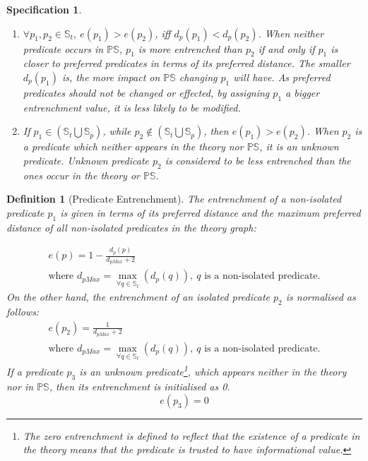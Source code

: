 \documentclass[11pt,letterpaper]{article}
\newtheorem{defn}{Definition}[section]
\newtheorem{spec}{Specification}
\newcommand{\ps}{\mathbb{PS}}
\begin{document}
\begin{spec}
\begin{enumerate}
\item $\forall p_{1},p_{2}  \in \mathbb{S}_{t},\ e(p_{1}) > e(p_{2})$, iff $d_{p}(p_{1}) < d_{p}(p_{2})$.\newline
\textnormal{When neither predicate occurs in $\ps$, $p_{1}$  is more entrenched than $p_{2}$  if and only if $p_{1}$ is closer to preferred predicates in terms of its preferred distance. The smaller $d_{p}(p_{1})$ is, the more impact on $\ps$ changing  $p_{1}$ will have. As preferred  predicates should not be changed or effected, by assigning $p_{1}$  a bigger entrenchment value, it is less likely to be modified. }
\item If $p_{1} \in (\mathbb{S}_{t} \bigcup \mathbb{S}_{p})$, while $p_{2} \not\in (\mathbb{S}_{t} \bigcup \mathbb{S}_{p})$, then $ e(p_{1}) > e(p_{2})$.\newline
\textnormal{When $p_{2}$ is a predicate which neither appears in the theory nor $\ps$, it is an \emph{unknown predicate}. Unknown predicate $p_{2}$ is considered to be less entrenched than the ones occur in the theory or $\ps$.}
\end{enumerate}
\end{spec}


\begin{defn}[Predicate Entrenchment]\label{def:predEn}
The entrenchment of a non-isolated predicate $p_{1}$ is given in terms of its preferred distance and the maximum preferred distance of all non-isolated predicates in the theory graph:

\begin{equation}\label{equ:predEntr1}
\begin{multlined}
    e(p) =1- \frac{d_{p}(p)}{d_{pMax}+2} \\
 \text{where } d_{pMax} = \max_{\forall q \in \mathbb{S}_t}(d_{p}(q)),\  q \text{ is a non-isolated predicate}.
\end{multlined}
\end{equation} 
On the other hand, the entrenchment of an isolated predicate $p_{2}$ is normalised as follows:
\begin{equation}\label{equ:predEntr2}
\begin{multlined}
    e(p_{2}) =\frac{1}{d_{pMax}+2} \\
 \text{where } d_{pMax} = \max_{\forall q \in \mathbb{S}_t}(d_{p}(q)),\  q \text{ is a non-isolated predicate}.
\end{multlined}
\end{equation}
If a predicate $p_{3}$ is an unknown predicate\footnote{The zero entrenchment is defined to reflect that the existence of a predicate in the theory means that the predicate is trusted to have informational value.}, which appears neither in the theory nor in $\ps$, then its entrenchment is initialised as 0.
\begin{equation}\label{equ:predEntr3}
    e(p_{3}) =0
\end{equation}
\end{defn}
\end{document}

